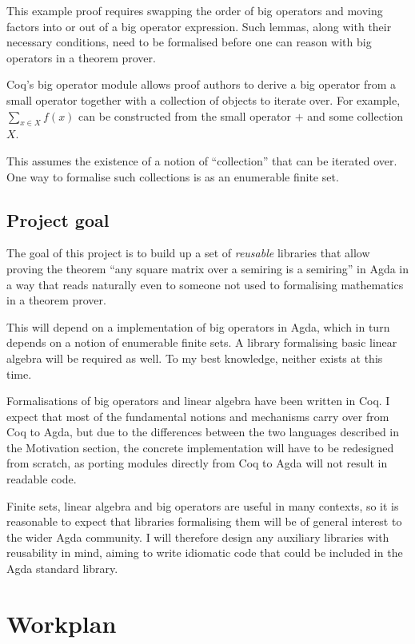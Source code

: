 \documentclass[a4paper]{scrartcl}
\begin{document}
This example proof requires swapping the order of big operators and moving factors into or out of a big operator expression. Such lemmas, along with their necessary conditions, need to be formalised before one can reason with big operators in a theorem prover.

Coq's big operator module allows proof authors to derive a big operator from a small operator together with a collection of objects to iterate over. For example, \(\sum_{x \in X} f(x)\) can be constructed from the small operator \(+\) and some collection \(X\).

This assumes the existence of a notion of \enquote{collection} that can be iterated over. One way to formalise such collections is as an enumerable finite set.

\subsection{Project goal}

The goal of this project is to build up a set of \emph{reusable} libraries that allow proving the theorem \enquote{any square matrix over a semiring is a semiring} in Agda in a way that reads naturally even to someone not used to formalising mathematics in a theorem prover.

This will depend on a implementation of big operators in Agda, which in turn depends on a notion of enumerable finite sets. A library formalising basic linear algebra will be required as well. To my best knowledge, neither exists at this time.

Formalisations of big operators and linear algebra have been written in Coq.
I expect that most of the fundamental notions and mechanisms carry over from Coq to Agda, but due to the differences between the two languages described in the Motivation section, the concrete implementation will have to be redesigned from scratch, as porting modules directly from Coq to Agda will not result in readable code.

Finite sets, linear algebra and big operators are useful in many contexts, so it is reasonable to expect that libraries formalising them will be of general interest to the wider Agda community. I will therefore design any auxiliary libraries with reusability in mind, aiming to write idiomatic code that could be included in the Agda standard library.

\section{Workplan}
\label{workplan}
\end{document}
